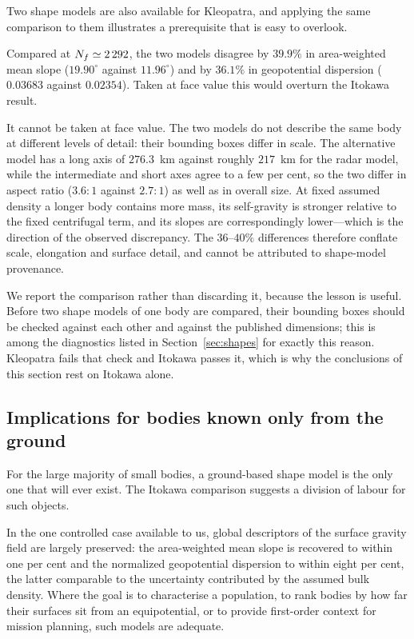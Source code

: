 Two shape models are also available for Kleopatra, and applying the same
comparison to them illustrates a prerequisite that is easy to overlook.

Compared at $N_{f} \simeq 2\,292$, the two models disagree by $39.9\%$ in
area-weighted mean slope ($19.90^{\circ}$ against $11.96^{\circ}$) and by
$36.1\%$ in geopotential dispersion ($0.03683$ against $0.02354$). Taken at face
value this would overturn the Itokawa result.

It cannot be taken at face value. The two models do not describe the same body
at different levels of detail: their bounding boxes differ in scale. The
alternative model has a long axis of $276.3$~km against roughly $217$~km for
the radar model, while the intermediate and short axes agree to a few per cent,
so the two differ in aspect ratio ($3.6{:}1$ against $2.7{:}1$) as well as in
overall size. At fixed assumed density a longer body contains more mass, its
self-gravity is stronger relative to the fixed centrifugal term, and its slopes
are correspondingly lower---which is the direction of the observed
discrepancy. The $36$--$40\%$ differences therefore conflate scale, elongation
and surface detail, and cannot be attributed to shape-model provenance.

We report the comparison rather than discarding it, because the lesson is
useful. Before two shape models of one body are compared, their bounding boxes
should be checked against each other and against the published dimensions; this
is among the diagnostics listed in Section~\ref{sec:shapes} for exactly this
reason. Kleopatra fails that check and Itokawa passes it, which is why the
conclusions of this section rest on Itokawa alone.

\subsection{Implications for bodies known only from the ground}
\label{sec:xvimplications}

For the large majority of small bodies, a ground-based shape model is the only
one that will ever exist. The Itokawa comparison suggests a division of labour
for such objects.

In the one controlled case available to us, global descriptors of the surface
gravity field are largely preserved: the area-weighted mean slope is recovered
to within one per cent and the normalized geopotential dispersion to within
eight per cent, the latter comparable to the uncertainty contributed by the
assumed bulk density. Where
the goal is to characterise a population, to rank bodies by how far their
surfaces sit from an equipotential, or to provide first-order context for
mission planning, such models are adequate.

